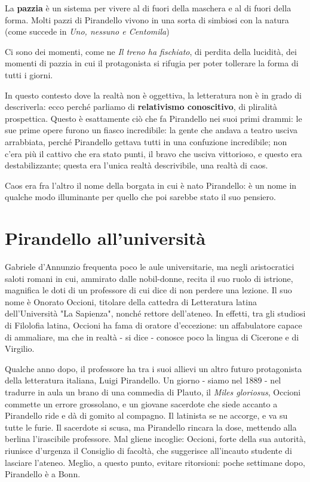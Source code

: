 La \textbf{pazzia} è un sistema per vivere al di fuori della maschera e al di fuori della forma. Molti pazzi di Pirandello vivono in una sorta di simbiosi con la natura (come succede in \textit{Uno, nessuno e Centomila})

Ci sono dei momenti, come ne \textit{Il treno ha fischiato}, di perdita della lucidità, dei momenti di pazzia in cui il protagonista si rifugia per poter tollerare la forma di tutti i giorni.

In questo contesto dove la realtà non è oggettiva, la letteratura non è in grado di descriverla: ecco perché parliamo di \textbf{relativismo conoscitivo}, di pliralità prospettica.
Questo è esattamente ciò che fa Pirandello nei suoi primi drammi: le sue prime opere furono un fiasco incredibile: la gente che andava a teatro usciva arrabbiata, perché Pirandello gettava tutti in una confuzione incredibile; non c'era più il cattivo che era stato punti, il bravo che usciva vittorioso, e questo era destabilizzante; questa era l'unica realtà descrivibile, una realtà di caos.

Caos era fra l'altro il nome della borgata in cui è nato Pirandello: è un nome in qualche modo illuminante per quello che poi sarebbe stato il suo pensiero.

\section{Pirandello all'università}

Gabriele d'Annunzio frequenta poco le aule universitarie, ma negli aristocratici saloti romani in cui, ammirato dalle nobil-donne, recita il suo ruolo di istrione, magnifica le doti di un professore di cui dice di non perdere una lezione. Il suo nome è Onorato Occioni, titolare della cattedra di Letteratura latina dell'Università "La Sapienza", nonché rettore dell'ateneo. In effetti, tra gli studiosi di Filolofia latina, Occioni ha fama di oratore d'eccezione: un affabulatore capace di ammaliare, ma che in realtà - si dice - conosce poco la lingua di Cicerone e di Virgilio.

Qualche anno dopo, il professore ha tra i suoi allievi un altro futuro protagonista della letteratura italiana, Luigi Pirandello. Un giorno - siamo nel 1889 - nel tradurre in aula un brano di una commedia di Plauto, il \textit{Miles gloriosus}, Occioni commette un errore grossolano, e un giovane sacerdote che siede accanto a Pirandello ride e dà di gomito al compagno. Il latinista se ne accorge, e va su tutte le furie. Il sacerdote si scusa, ma Pirandello rincara la dose, mettendo alla berlina l'irascibile professore. Mal gliene incoglie: Occioni, forte della sua autorità, riunisce d'urgenza il Consiglio di facoltà, che suggerisce all'incauto studente di lasciare l'ateneo. Meglio, a questo punto, evitare ritorsioni: poche settimane dopo, Pirandello è a Bonn.


